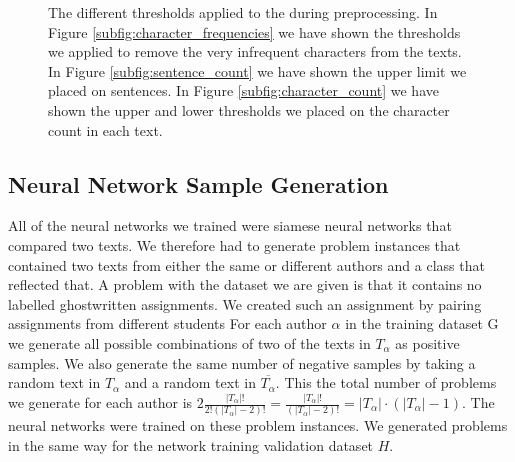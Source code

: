 \begin{figure}[htb]
\begin{minipage}{.5\linewidth}
{        }
    \end{minipage}\par\medskip
    \centering

    \caption{The different thresholds applied to the during preprocessing. In
        Figure \ref{subfig:character_frequencies} we have shown the thresholds
        we applied to remove the very infrequent characters from the texts. In
        Figure \ref{subfig:sentence_count} we have shown the upper limit we
        placed on sentences. In Figure \ref{subfig:character_count} we have
        shown the upper and lower thresholds we placed on the character count in
        each text.
    }
    \label{fig:cutoff_thresholds}
\end{figure}


\subsection{Neural Network Sample Generation} \label{subsec:problem_generation}

All of the neural networks we trained were siamese neural networks that
compared two texts. We therefore had to generate problem instances that
contained two texts from either the same or different authors and a class that
reflected that. A problem with the dataset we are given is that it contains
no labelled ghostwritten assignments. We created such an assignment by
pairing assignments from different students For each author $\alpha$ in the
training dataset \gls{G} we generate all possible combinations of two of the
texts in $T_\alpha$ as positive samples. We also generate the same number
of negative samples by taking a random text in $T_\alpha$ and a random text
in $\overline{T_\alpha}$. This the total number of problems we generate for
each author is $2\frac{\left|T_\alpha\right|!}{2!(\left|T_\alpha\right|-2)!}
= \frac{\left|T_\alpha\right|!}{(\left|T_\alpha\right|-2)!} =
\left|T_\alpha\right| \cdot (\left|T_\alpha\right| - 1) $. The neural networks
were trained on these problem instances. We generated problems in the same way
for the network training validation dataset $H$.

